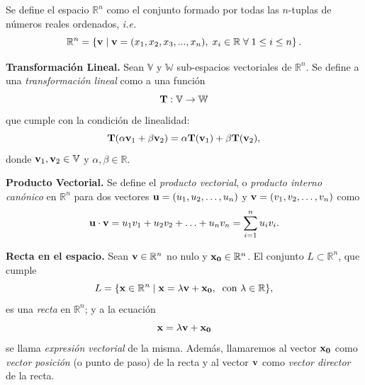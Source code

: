 \begin{definition}
  Se define el  espacio $\mathbb{R}^n$  como el conjunto formado por todas las $n$-tuplas de n\'umeros reales ordenados, \textit{i.e.}
    \begin{equation*}
        \mathbb{R}^n = \left\{ \vect{v}\;\rvert\;\vect{v}=(x_1,x_2,x_3,...,x_n), \; x_i \in \mathbb{R} \;\forall \;   1\leq  i \leq n  \right\}.
    \end{equation*}
\end{definition}

\begin{definition}{\textbf{Transformación Lineal.}}
  Sean  $\mathbb{V}$ y $\mathbb{W}$ sub-espacios vectoriales de $\mathbb{R}^n$.  Se  define a  una \textit{transformación lineal}  como a  una función 
    \begin{equation*}
       \campoVec{T}: \mathbb{V} \rightarrow  \mathbb{W}
    \end{equation*}
    que cumple con la condición de linealidad:
    \begin{equation}\label{tl}
        \campoVec{T}(\alpha\vect{v}_1 + \beta\vect{v}_2)=\alpha\campoVec{T}(\vect{v}_1) + \beta\campoVec{T}(\vect{v}_2),
    \end{equation}
    donde $\vect{v}_1,\vect{v}_2 \in \mathbb{V}$ y $\alpha,\beta \in \mathbb{R}$. 
    \label{def:TL}
\end{definition}

\begin{definition}{\textbf{Producto Vectorial.}}
    Se define el \textit{producto vectorial}, o \textit{producto interno canónico} en $\mathbb{R}^n$ para dos vectores
    $\vect{u}=(u_1, u_2,\ldots, u_n )$ y $\vect{v}=(v_1,v_2,\ldots,v_n)$ como
    \begin{equation*}
      \vect{u} \cdot \vect{v} = u_1v_1 + u_2v_2 + \ldots + u_nv_n = \sum_{i = 1}^{n} u_iv_i . 
    \end{equation*}
\end{definition}

\begin{definition} {\textbf{Recta en el espacio.}}
  Sean $\vect{v}\in\mathbb{R}^n$   no nulo y  $\vect{x_0}\in\mathbb{R}^n$.  El conjunto $L \subset \mathbb{R}^n $,  que cumple  
 \begin{equation*}
      L = \{   \vect{x} \in\mathbb{R}^n  \;\rvert\;    \vect{x}=  \lambda  \vect{v} + \vect{x_0},  \:  \mbox{  con }  \lambda\in\mathbb{R} \},
    \end{equation*}  es una \textit{recta} en $ \mathbb{R}^n$;  y a la ecuaci\'on $$ \vect{x}=  \lambda  \vect{v} + \vect{x_0}$$  se  llama  \emph{expresi\'on vectorial} de la misma.  
    Adem\'as, llamaremos al vector $\vect{x_0}$ como \emph{vector posici\'on} (o punto de paso) de la recta y al vector $\vect{v}$ como \emph{vector director} de la recta.
 \end{definition}

